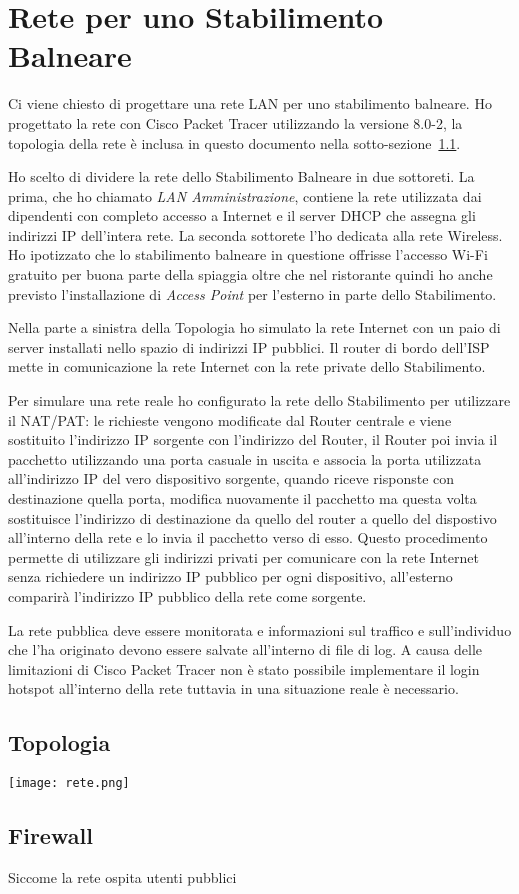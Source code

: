 \section{Rete per uno Stabilimento Balneare}%
\label{sec:rete}

Ci viene chiesto di progettare una rete LAN per uno stabilimento balneare. Ho progettato la rete con Cisco Packet Tracer utilizzando la versione 8.0-2, la topologia della rete \`e inclusa in questo documento nella sotto-sezione~\ref{sub:topologia}.

Ho scelto di dividere la rete dello Stabilimento Balneare in due sottoreti. La prima, che ho chiamato \emph{LAN Amministrazione}, contiene la rete utilizzata dai dipendenti con completo accesso a Internet e il server DHCP che assegna gli indirizzi IP dell'intera rete. La seconda sottorete l'ho dedicata alla rete Wireless. Ho ipotizzato che lo stabilimento balneare in questione offrisse l'accesso Wi-Fi gratuito per buona parte della spiaggia oltre che nel ristorante quindi ho anche previsto l'installazione di \emph{Access Point} per l'esterno in parte dello Stabilimento.

Nella parte a sinistra della Topologia ho simulato la rete Internet con un paio di server installati nello spazio di indirizzi IP pubblici. Il router di bordo dell'ISP mette in comunicazione la rete Internet con la rete private dello Stabilimento.

Per simulare una rete reale ho configurato la rete dello Stabilimento per utilizzare il NAT/PAT: le richieste vengono modificate dal Router centrale e viene sostituito l'indirizzo IP sorgente con l'indirizzo del Router, il Router poi invia il pacchetto utilizzando una porta casuale in uscita e associa la porta utilizzata all'indirizzo IP del vero dispositivo sorgente, quando riceve risponste con destinazione quella porta, modifica nuovamente il pacchetto ma questa volta sostituisce l'indirizzo di destinazione da quello del router a quello del dispostivo all'interno della rete e lo invia il pacchetto verso di esso. Questo procedimento permette di utilizzare gli indirizzi privati per comunicare con la rete Internet senza richiedere un indirizzo IP pubblico per ogni dispositivo, all'esterno comparir\`a l'indirizzo IP pubblico della rete come sorgente.

La rete pubblica deve essere monitorata e informazioni sul traffico e sull'individuo che l'ha originato devono essere salvate all'interno di file di log. A causa delle limitazioni di Cisco Packet Tracer non \`e stato possibile implementare il login hotspot all'interno della rete tuttavia in una situazione reale \`e necessario.

\begin{landscape}
    \subsection{Topologia}%
    \label{sub:topologia}
    \thispagestyle{empty}
    \texttt{[image: rete.png]}
\end{landscape}

\subsection{Firewall}
Siccome la rete ospita utenti pubblici 
